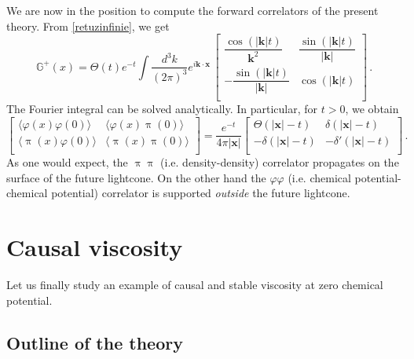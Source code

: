 \documentclass[a4paper, amsfonts, amssymb, amsmath, reprint, showkeys, nofootinbib, twoside,notitlepage,onecolumn]{revtex4-2}
\newcommand{\Ga}{{\mathbb{G}}}
\newcommand{\x}{{\textbf{x}}}
\newcommand{\kb}{{\textbf{k}}}
\theoremstyle{definition}
\begin{document}
We are now in the position to compute the forward correlators of the present theory. From \eqref{retuzinfinie}, we get
\begin{equation}\label{cacioppoli2}
  \Ga^+(x) =\Theta(t) e^{-t} \int \dfrac{d^3 k}{(2\pi)^3} e^{i\textbf{k}\cdot \x} \,
  \begin{bmatrix}
      \dfrac{\cos(|\kb|t)}{\kb^2} & \dfrac{\sin(|\kb|t)}{|\kb|} \\
      -\dfrac{\sin(|\kb|t)}{|\kb|} & \cos(|\kb|t) \\
  \end{bmatrix} \, .
\end{equation}
The Fourier integral can be solved analytically. In particular, for $t>0$, we obtain
\begin{equation}
\begin{bmatrix}
        \langle \varphi(x)\varphi(0)\rangle & \langle \varphi(x)\uppi(0) \rangle  \\
    \langle \uppi(x)\varphi(0)\rangle & \langle \uppi(x)\uppi(0)\rangle \\
\end{bmatrix}
=
\dfrac{e^{-t}}{4\pi |\x|}
\begin{bmatrix}
    \Theta(|\x|-t) & \delta(|\x|-t) \\
    -\delta(|\x|-t) & -\delta'(|\x|-t) \\
\end{bmatrix} \, .
\end{equation}
As one would expect, the $\uppi \uppi$ (i.e. density-density) correlator propagates on the surface of the future lightcone. On the other hand the $\varphi\varphi$ (i.e. chemical potential-chemical potential) correlator is supported \textit{outside} the future lightcone.




\section{Causal viscosity}\label{causalviscone}

Let us finally study an example of causal and stable viscosity at zero chemical potential.

\subsection{Outline of the theory}
\end{document}
